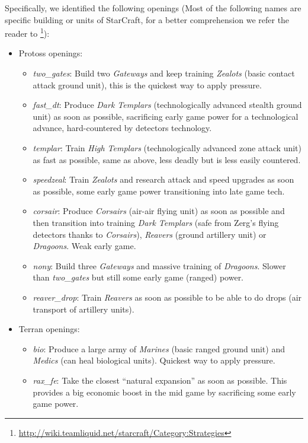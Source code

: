 \documentclass[journal]{IEEEtran}
\begin{document}
Specifically, we identified the following openings (Most of the following names are specific building or units of StarCraft, for a better comprehension we refer the reader to \footnote{\url{http://wiki.teamliquid.net/starcraft/Category:Strategies}}):
\begin{itemize}
  \item Protoss openings:
  \begin{itemize}
    \item \emph{two\_gates}: Build two \emph{Gateways} and keep training \emph{Zealots} (basic contact attack ground unit), this is the quickest way to apply pressure.
    \item \emph{fast\_dt}: Produce \emph{Dark Templars} (technologically advanced stealth ground unit) as soon as possible, sacrificing early game power for a technological advance, hard-countered by detectors technology.
    \item \emph{templar}: Train \emph{High Templars} (technologically advanced zone attack unit) as fast as possible, same as above, less deadly but is less easily countered.
    \item \emph{speedzeal}: Train \emph{Zealots} and research attack and speed upgrades as soon as possible, some early game power transitioning into late game tech.
    \item \emph{corsair}: Produce \emph{Corsairs} (air-air flying unit) as soon as possible and then transition into training \emph{Dark Templars} (safe from Zerg's flying detectors thanks to \emph{Corsairs}), \emph{Reavers} (ground artillery unit) or \emph{Dragoons}. Weak early game.
    \item \emph{nony}: Build three \emph{Gateways} and massive training of \emph{Dragoons}. Slower than \emph{two\_gates} but still some early game (ranged) power.
    \item \emph{reaver\_drop}: Train \emph{Reavers} as soon as possible to be able to do drops (air transport of artillery units).
  \end{itemize}
  \item Terran openings:
  \begin{itemize}
    \item \emph{bio}: Produce a large army of \emph{Marines} (basic ranged ground unit) and \emph{Medics} (can heal biological units). Quickest way to apply pressure.
    \item \emph{rax\_fe}: Take the closest ``natural expansion'' as soon as possible. This provides a big economic boost in the mid game by sacrificing some early game power.

\end{itemize}
\end{itemize}
\end{document}
